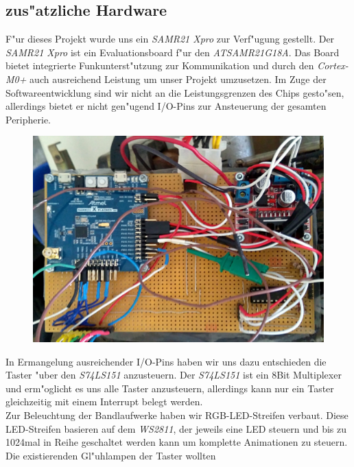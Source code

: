 \documentclass[a4paper]{article}
\begin{document}
  \subsection{zus"atzliche Hardware}
    \label{sec:hardware_additional}
    F"ur dieses Projekt wurde uns ein \textit{SAMR21 Xpro} zur Verf"ugung
    gestellt. Der \textit{SAMR21 Xpro} ist ein Evaluationsboard f"ur den
    \textit{ATSAMR21G18A}. Das Board bietet integrierte Funkunterst"utzung zur
    Kommunikation und durch den \textit{Cortex-M0+} auch ausreichend Leistung um
    unser Projekt umzusetzen. Im Zuge der Softwareentwicklung sind wir nicht
    an die Leistungsgrenzen des Chips gesto"sen, allerdings bietet er nicht
    gen"ugend I/O-Pins zur Ansteuerung der gesamten Peripherie.\\
    \begin{figure}
      \centering
      \label{figure:Hardwareplattform}
      \includegraphics[scale=0.05]{Platine.jpg}
    \end{figure}
    In Ermangelung ausreichender I/O-Pins haben wir uns dazu entschieden die Taster
    "uber den \textit{S74LS151} anzusteuern. Der \textit{S74LS151} ist ein 8Bit
    Multiplexer und erm"oglicht es uns alle Taster anzusteuern, allerdings kann
    nur ein Taster gleichzeitig mit einem Interrupt belegt werden.\\
    Zur Beleuchtung der Bandlaufwerke haben wir RGB-LED-Streifen verbaut. Diese
    LED-Streifen basieren auf dem \textit{WS2811}, der jeweils eine LED steuern
    und bis zu 1024mal in Reihe geschaltet werden kann um komplette
    Animationen zu steuern. Die existierenden Gl"uhlampen der Taster wollten
\end{document}
